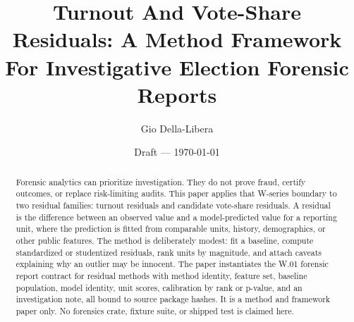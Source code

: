 \documentclass[12pt]{article}
\title{Turnout And Vote-Share Residuals:
A Method Framework For Investigative Election Forensic Reports}
\author{Gio Della-Libera}
\date{Draft --- \today}
\begin{document}
\maketitle

\begin{abstract}
Forensic analytics can prioritize investigation. They do not prove fraud,
certify outcomes, or replace risk-limiting audits. This paper applies that
W-series boundary to two residual families: turnout residuals and candidate
vote-share residuals. A residual is the difference between an observed value and
a model-predicted value for a reporting unit, where the prediction is fitted
from comparable units, history, demographics, or other public features. The
method is deliberately modest: fit a baseline, compute standardized or
studentized residuals, rank units by magnitude, and attach caveats explaining
why an outlier may be innocent. The paper instantiates the W.01 forensic report
contract for residual methods with method identity, feature set, baseline
population, model identity, unit scores, calibration by rank or p-value, and an
investigation note, all bound to source package hashes. It is a method and
framework paper only. No forensics crate, fixture suite, or shipped test is
claimed here.
\end{abstract}








\nocite{rcount-overview-2026,wseries-overview-2026}


\end{document}
